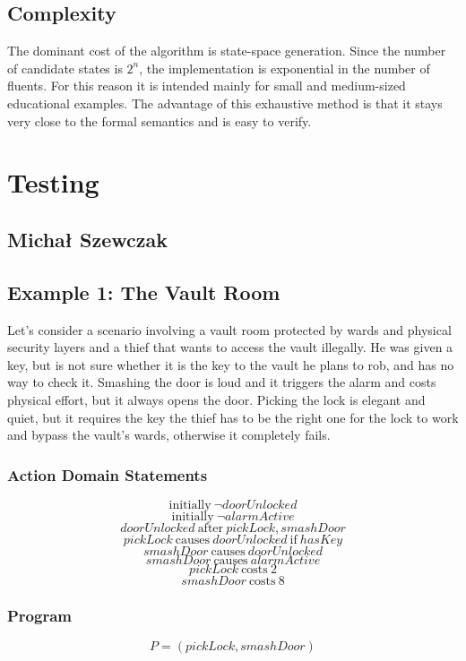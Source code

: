 \documentclass[11pt]{article}
\begin{document}
\subsection{Complexity}
The dominant cost of the algorithm is state-space generation. Since the number of
candidate states is \(2^n\), the implementation is exponential in the number of
fluents. For this reason it is intended mainly for small and medium-sized
educational examples. The advantage of this exhaustive method is that it stays
very close to the formal semantics and is easy to verify.

\section{Testing}
\subsection*{Michał Szewczak}
\subsection*{Example 1: The Vault Room}
Let's consider a scenario involving a vault room protected by wards and physical security layers and a thief that wants to access the vault illegally. He was given a key, but is not sure whether it is the key to the vault he plans to rob, and has no way to check it. Smashing the door is loud and it triggers the alarm and costs physical effort, but it always opens the door. Picking the lock is elegant and quiet, but it requires the key the thief has to be the right one for the lock to work and bypass the vault's wards, otherwise it completely fails.

\subsubsection*{Action Domain Statements}
\[
\text{initially}~ \neg doorUnlocked
\]
\[
\text{initially}~ \neg alarmActive
\]
\[
doorUnlocked ~\text{after}~ pickLock, smashDoor
\]
\[
pickLock ~\text{causes}~ doorUnlocked ~\text{if}~ hasKey
\]
\[
smashDoor ~\text{causes}~ doorUnlocked
\]
\[
smashDoor ~\text{causes}~ alarmActive
\]
\[
pickLock ~\text{costs}~ 2
\]
\[
smashDoor ~\text{costs}~ 8
\]

\subsubsection*{Program}
\[
P = (pickLock, smashDoor)
\]
\end{document}
